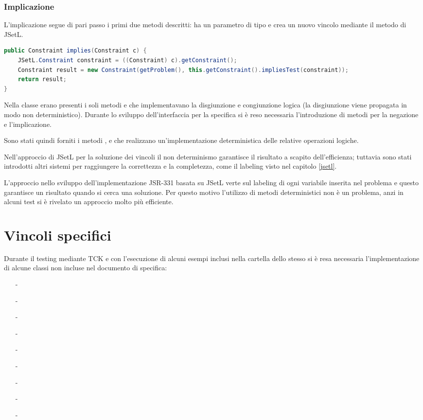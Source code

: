 \subsubsection{Implicazione}
L'implicazione segue di pari passo i primi due metodi descritti: ha un parametro
di tipo  e crea un nuovo vincolo mediante il metodo
 di JSetL.
\begin{lstlisting}[language = Java,
                   caption = {\files{implies}.}]
public Constraint implies(Constraint c) {	
	JSetL.Constraint constraint = ((Constraint) c).getConstraint();
	Constraint result = new Constraint(getProblem(), this.getConstraint().impliesTest(constraint));
	return result;
}
\end{lstlisting}
\begin{nota}
Nella classe  erano presenti i soli metodi  e
 che implementavano la disgiunzione e congiunzione logica
(la disgiunzione viene propagata in modo 
non deterministico). Durante lo sviluppo dell'interfaccia per la specifica si
è reso necessaria l'introduzione di metodi per
la negazione e l'implicazione.

Sono stati quindi forniti i metodi , e
 che realizzano un'implementazione deterministica delle
relative operazioni logiche.

Nell'approccio di JSetL per la soluzione dei vincoli il non determinismo 
garantisce il risultato a scapito dell'efficienza; tuttavia sono stati 
introdotti altri sistemi per raggiungere la correttezza e la completezza, come 
il labeling visto nel capitolo \ref{jsetl}.

L'approccio nello sviluppo dell'implementazione JSR-331 basata su JSetL verte 
sul labeling di ogni
variabile inserita nel problema e questo garantisce un risultato quando si
cerca una soluzione. Per questo motivo l'utilizzo di metodi  deterministici
non è un problema, anzi in alcuni test si è rivelato un approccio molto
più efficiente.
\end{nota}

\section{Vincoli specifici}\label{nuoviConstraint}
Durante il testing mediante TCK e con l'esecuzione di alcuni
esempi inclusi nella cartella  dello stesso si è resa necessaria
l'implementazione di alcune classi non incluse nel documento di specifica:
\begin{itemize}
  \item[-]
  \item[-]
  \item[-]
  \item[-]
  \item[-]
  \item[-]
  \item[-]
  \item[-]
  \item[-]
\end{itemize}

